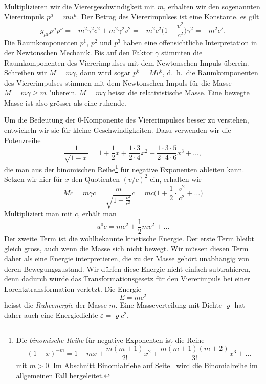 Multiplizieren wir die Vierergeschwindigkeit mit $m$, erhalten wir
den sogenannten Viererimpuls $p^\mu = mu^\mu$.
Der Betrag des Viererimpulses ist eine Konstante, es gilt
\[
g_{\mu\nu}p^\mu p^\nu
=
-
m^2\gamma^2 c^2
+
m^2 \gamma^2 v^2
=
-m^2c^2\biggl(\displaystyle 1-\frac{v^2}{c^2}\biggr)\gamma^2
=
-m^2c^2.
\]
Die Raumkomponenten $p^1$, $p^2$ und $p^3$ haben eine offensichtliche
Interpretation in der Newtonschen Mechanik.
Bis auf den Faktor $\gamma$ stimmten die Raumkomponenten des Viererimpulses
mit dem Newtonschen Impuls überein.
Schreiben wir $M=m\gamma$, dann wird sogar $p^k = M v^k$, d.~h.~die
Raumkomponenten des Viererimpulses stimmen mit dem Newtonschen Impuls 
für die Masse $M=m\gamma  \ge m$ "uberein.
$M=m\gamma$ heisst die relativistische Masse.
Eine bewegte Masse ist also grösser als eine ruhende.

Um die Bedeutung der $0$-Komponente des Viererimpulses besser zu
verstehen, entwickeln wir sie für kleine Geschwindigkeiten.
Dazu verwenden wir die Potenzreihe
\[
\frac1{\sqrt{1-x}}
=
1+\frac12x+\frac{1\cdot 3}{2\cdot 4}x^2 + \frac{1\cdot 3\cdot 5}{2\cdot 4\cdot 6}x^3+\dots,
\]
die man aus der binomischen Reihe\footnote{%
Die {\em binomische Reihe} für negative Exponenten ist die Reihe
\[
(1\pm x)^{-m}
=
1\mp mx +\frac{m(m+1)}{2!}x^2 \mp \frac{m(m+1)(m+2)}{3!} x^3 +\dots
\]
mit $m>0$.
%
Im Abschnitt Binomialriehe auf Seite~\pageref{skript:multipol:binomialreihe}
wird die Binomialreihe im allgemeinen Fall hergeleitet.
} für negative Exponenten ableiten kann.
Setzen wir hier für $x$ den Quotienten $(v/c)^2$ ein, erhalten wir
\[
Mc
=
m\gamma c
=
\frac{m}{\sqrt{1-\displaystyle\frac{v^2}{c^2}}} c
=
mc\biggl(1+\frac12\cdot\frac{v^2}{c^2}+\dots\biggl)
\]
Multipliziert man mit $c$, erhält man 
\[
u^0c = mc^2 + \frac12mv^2+\dots
\]
Der zweite Term ist die wohlbekannte kinetische Energie.
Der erste Term bleibt gleich gross, auch wenn die Masse sich
nicht bewegt.
Wir müssen diesen Term daher als eine Energie interpretieren, die
zu der Masse gehört unabhängig von deren Bewegungszustand.
Wir dürfen diese Energie nicht einfach subtrahieren, denn dadurch
würde das Transformationsgesetz für den Viererimpuls bei einer
Lorentztransformation verletzt.
Die Energie
\begin{equation}
E=mc^2
\label{E=mc2}
\end{equation}
heisst die {\em Ruheenergie} der Masse $m$.
%
Eine Masseverteilung mit Dichte $\varrho$ hat daher auch
eine Energiedichte $\varepsilon=\varrho c^2$.

